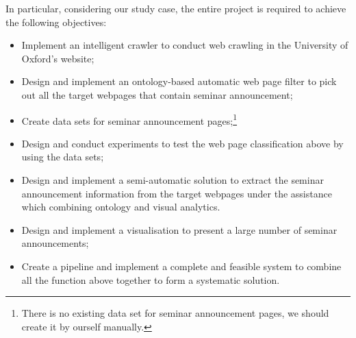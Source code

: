 In particular, considering our study case, the entire project is required to achieve the following objectives:
\begin{itemize}
	\item Implement an intelligent crawler to conduct web crawling in the University of Oxford's website;
	\item Design and implement an ontology-based automatic web page filter to pick out all the target webpages that contain seminar announcement;
	\item Create data sets for seminar announcement pages;\footnote{There is no existing data set for seminar announcement pages, we should create it by ourself manually.}
	\item Design and conduct experiments to test the web page classification above by using the data sets;
	\item Design and implement a semi-automatic solution to extract the seminar announcement information from the target webpages under the assistance which combining ontology and visual analytics.
	\item Design and implement a visualisation to present a large number of seminar announcements;
	\item Create a pipeline and implement a complete and feasible system to combine all the function above together to form a systematic solution.
\end{itemize}

